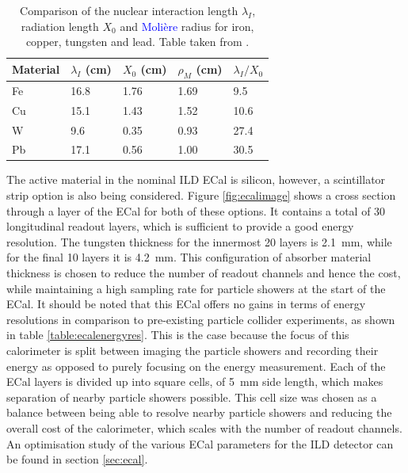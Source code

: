 \begin{table}[h!]
\centering
\begin{tabular}{ l l l l l}
\hline
Material & $\lambda_{I}$ (cm) & $X_{0}$ (cm) & $\rho_{M}$ (cm) & $ \lambda_{I}/X_{0}$ \\
\hline
Fe & 16.8 & 1.76 & 1.69 & 9.5 \\
Cu & 15.1 & 1.43 & 1.52 & 10.6 \\
W & 9.6 & 0.35 & 0.93 & 27.4 \\
Pb & 17.1 & 0.56 & 1.00 & 30.5 \\
\hline
\end{tabular}
\caption[Comparison of the nuclear interaction length $\lambda_{I}$, radiation length $X_{0}$ and \textcolor{blue}{Moli\`{e}re} radius for iron, copper, tungsten and lead.  Table taken from \cite{arXiv:0907.3577}.]{Comparison of the nuclear interaction length $\lambda_{I}$, radiation length $X_{0}$ and \textcolor{blue}{Moli\`{e}re} radius for iron, copper, tungsten and lead.  Table taken from \cite{arXiv:0907.3577}.}
\label{table:absorberoptions}
\end{table}

The active material in the nominal ILD ECal is silicon, however, a scintillator strip option is also being considered.  Figure \ref{fig:ecalimage} shows a cross section through a layer of the ECal for both of these options.  It contains a total of 30 longitudinal readout layers, which is sufficient to provide a good energy resolution.  The tungsten thickness for the innermost 20 layers is 2.1~mm, while for the final 10 layers it is 4.2~mm.  This configuration of absorber material thickness is chosen to reduce the number of readout channels and hence the cost, while maintaining a high sampling rate for particle showers at the start of the ECal.  It should be noted that this ECal offers no gains in terms of energy resolutions in comparison to pre-existing particle collider experiments, as shown in table \ref{table:ecalenergyres}.  This is the case because the focus of this calorimeter is split between imaging the particle showers and recording their energy as opposed to purely focusing on the energy measurement.  Each of the ECal layers is divided up into square cells, of 5~mm side length, which makes separation of nearby particle showers possible.  This cell size was chosen as a balance between being able to resolve nearby particle showers and reducing the overall cost of the calorimeter, which scales with the number of readout channels.  An optimisation study of the various ECal parameters for the ILD detector can be found in section \ref{sec:ecal}.

